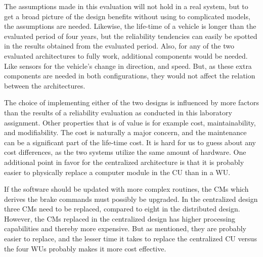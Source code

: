 The assumptions made in this evaluation will not hold in a real system, but to get a broad picture of the design benefits without using to complicated models, the assumptions are needed. Likewise, the life-time of a vehicle is longer than the evaluated period of four years, but the reliability tendencies can easily be spotted in the results obtained from the evaluated period. Also, for any of the two evaluated architectures to fully work, additional components would be needed. Like sensors for the vehicle's change in direction, and speed. But, as these extra components are needed in both configurations, they would not affect the relation between the architectures.

The choice of implementing either of the two designs is influenced by more factors than the results of a reliability evaluation as conducted in this laboratory assignment. Other properties that is of value is for example cost, maintainability, and modifiability. The cost is naturally a major concern, and the maintenance can be a significant part of the life-time cost. It is hard for us to guess about any cost differences, as the two systems utilize the same amount of hardware. One additional point in favor for the centralized architecture is that it is probably easier to physically replace a computer module in the CU than in a WU. 

If the software should be updated with more complex routines, the CMs which derives the brake commands must possibly be upgraded. In the centralized design three CMs need to be replaced, compared to eight in the distributed design. However, the CMs replaced in the centralized design has higher processing capabilities and thereby more expensive. But as mentioned, they are probably easier to replace, and the lesser time it takes to replace the centralized CU versus the four WUs probably makes it more cost effective. 